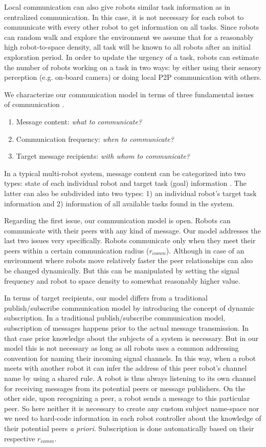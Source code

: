 \documentclass[final,5p,times,twocolumn]{elsarticle}
\begin{document}
Local communication can also give robots similar task information as in centralized communication. In this case, it is not necessary for each robot to communicate with every other robot to get information on all tasks. Since robots can random walk and explore the environment we assume that for a reasonably high robot-to-space density, all task will be known to all robots after an initial exploration period. In order to update the urgency of a task, robots can estimate the number of robots working on a task in two ways:  by either using their sensory perception (e.g. on-board camera) or  doing local P2P communication with others.

We characterize our communication model in terms of three fundamental issues of communication \cite{Gerkey+2001}. 
\begin{enumerate}
\item Message content: {\em what to communicate?}
\item Communication frequency: {\em when to communicate?}
\item Target message recipients: {\em with whom to communicate?}
\end{enumerate}
In a typical multi-robot system, message content can be categorized into two types: state of each individual robot and target task (goal) information \cite{Balch2005}. The latter can also be subdivided into two types: 1) an individual robot's target task information and 2) information of all available tasks found in the system.

Regarding the first issue, our communication model is open. Robots can communicate with their peers with any kind of message. Our model addresses the last two issues very specifically. Robots communicate only when they meet their peers within a certain communication radius ($r_{comm}$). Although in case of an environment where robots move relatively faster the peer relationships can also be changed dynamically. But this can be manipulated by setting the signal frequency and robot to space density to somewhat reasonably higher value.

In terms of target recipients, our model differs from a traditional publish/subscribe communication model by introducing the concept of dynamic subscription. In a traditional publish/subscribe communication model, subscription of messages happens prior to the actual message transmission. In that case prior knowledge about the subjects of a system is necessary. But in our model this is not necessary as long as all robots uses a common addressing convention for naming their incoming signal channels. In this way, when a robot meets with another robot it can infer the address of this peer robot's channel name by using a shared rule. A robot is thus always listening to its own channel for receiving messages from its potential peers or message publishers. On the other side, upon recognizing a peer, a robot sends a message to this particular peer. So here neither it is necessary to create any custom subject name-space  \cite{Gerkey+2001} nor we need to hard-code information in each robot controller about the knowledge of their potential peers {\em a priori}. Subscription is done automatically based on their respective $r_{comm}$.
%
\end{document}
